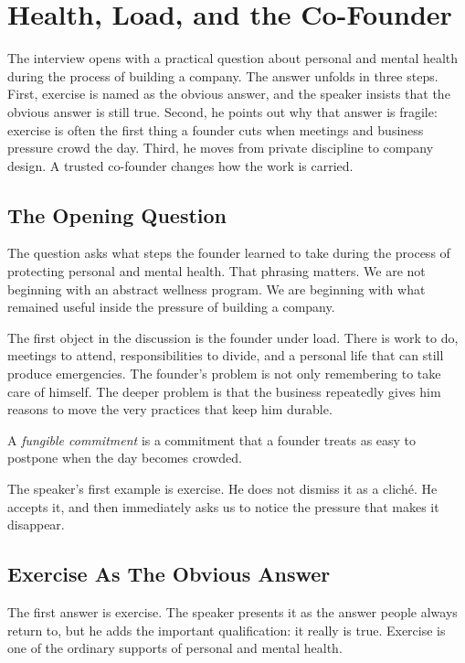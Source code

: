 \chapter{Health, Load, and the Co-Founder}

The interview opens with a practical question about personal and mental health during the process of building a company. The answer unfolds in three steps. First, exercise is named as the obvious answer, and the speaker insists that the obvious answer is still true. Second, he points out why that answer is fragile: exercise is often the first thing a founder cuts when meetings and business pressure crowd the day. Third, he moves from private discipline to company design. A trusted co-founder changes how the work is carried.

\section{The Opening Question}

The question asks what steps the founder learned to take during the process of protecting personal and mental health. That phrasing matters. We are not beginning with an abstract wellness program. We are beginning with what remained useful inside the pressure of building a company.

The first object in the discussion is the founder under load. There is work to do, meetings to attend, responsibilities to divide, and a personal life that can still produce emergencies. The founder's problem is not only remembering to take care of himself. The deeper problem is that the business repeatedly gives him reasons to move the very practices that keep him durable.

\begin{definition}
A \emph{fungible commitment} is a commitment that a founder treats as easy to postpone when the day becomes crowded.
\end{definition}

The speaker's first example is exercise. He does not dismiss it as a cliché. He accepts it, and then immediately asks us to notice the pressure that makes it disappear.

\section{Exercise As The Obvious Answer}

The first answer is exercise. The speaker presents it as the answer people always return to, but he adds the important qualification: it really is true. Exercise is one of the ordinary supports of personal and mental health.

